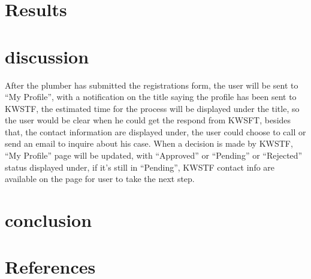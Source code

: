 \documentclass{article}
\begin{document}
\section{Results}
\lipsum[2-3]
\section{discussion}
After the plumber has submitted the registrations form, the user will be sent to “My Profile”, with a notification on the title saying
the profile has been sent to KWSTF, the estimated time for the process will be displayed under the title, so the user would be clear
when he could get the respond from KWSFT, besides that, the contact information are displayed under, the user could choose to
call or send an email to inquire about his case.
When a decision is made by KWSTF, “My Profile” page will be updated, with “Approved” or “Pending” or “Rejected” status
displayed under, if it’s still in “Pending”, KWSTF contact info are available on the page for user to take the next step.

\section{conclusion}
\section{References}
\end{document}
